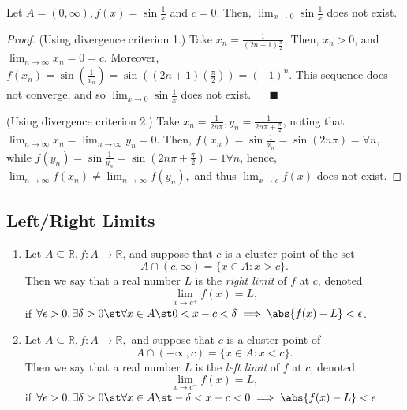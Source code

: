 \documentclass[12pt]{article}
\renewcommand{\qedsymbol}{$\blacksquare$}
\begin{document}
\begin{example}
  Let $A = (0, \infty), f(x) = \sin \frac{1}{x}$ and $c = 0$. Then, $\lim_{x \to 0} \sin \frac{1}{x}$ does not exist.
  \begin{proof}
    (Using divergence criterion 1.) Take $x_n = \frac{1}{(2n+1) \frac{\pi}{2}}$. Then, $x_n > 0$, and $\lim_{n \to \infty} x_n = 0 = c$. Moreover, $f(x_n) = \sin (\frac{1}{x_n}) = \sin ((2n+1)(\frac{\pi}{2})) = (-1)^{n}$. This sequence does not converge, and so $\lim_{x \to 0} \sin \frac{1}{x}$ does not exist. $\quad$ \qedsymbol

    \noindent(Using divergence criterion 2.) Take $x_n = \frac{1}{2n\pi}, y_n = \frac{1}{2n\pi + \frac{\pi}{2}}$, noting that $\lim_{n\to\infty} x_n = \lim_{n \to \infty} y_n = 0$. Then, $f(x_n) = \sin \frac{1}{x_n} = \sin (2n \pi) = \forall n$, while $f(y_n) = \sin \frac{1}{y_n} = \sin (2n \pi + \frac{\pi}{2}) = 1 \forall n$, hence, $\lim_{n\to\infty} f(x_n) \neq \lim_{n\to\infty} f(y_n),$ and thus $\lim_{x\to c} f(x)$ does not exist.
  \end{proof}
\end{example}

\subsection{Left/Right Limits}

\begin{definition}
  \begin{enumerate}
    \item Let $A\subseteq \mathbb{R}, f : A \to \mathbb{R}$, and suppose that $c$ is a cluster point of the set \[
      A \cap (c, \infty) = \{x \in A : x > c\}.
    \]
    Then we say that a real number $L$ is the \emph{right limit} of $f$ at $c$, denoted \[
    \lim_{x\to c^+} f(x)= L,
    \]
    if $\forall \epsilon > 0, \exists \delta > 0 \st \forall x \in A \st 0 < x - c < \delta \implies \abs{f(x) - L} < \epsilon$.
    \item Let $A \subseteq \mathbb{R}, f: A \to \mathbb{R},$ and suppose that $c$ is a cluster point of \[
    A \cap (- \infty, c) = \{x \in A : x < c\}.
    \]
    Then we say that a real number $L$ is the \emph{left limit} of $f$ at $c$, denoted \[
    \lim_{x \to c^-} f(x) = L,  
    \]
    if $\forall \epsilon > 0, \exists \delta > 0 \st \forall x \in A \st - \delta < x - c < 0 \implies \abs{f(x) - L} < \epsilon$.
  \end{enumerate}
\end{definition}
\end{document}
